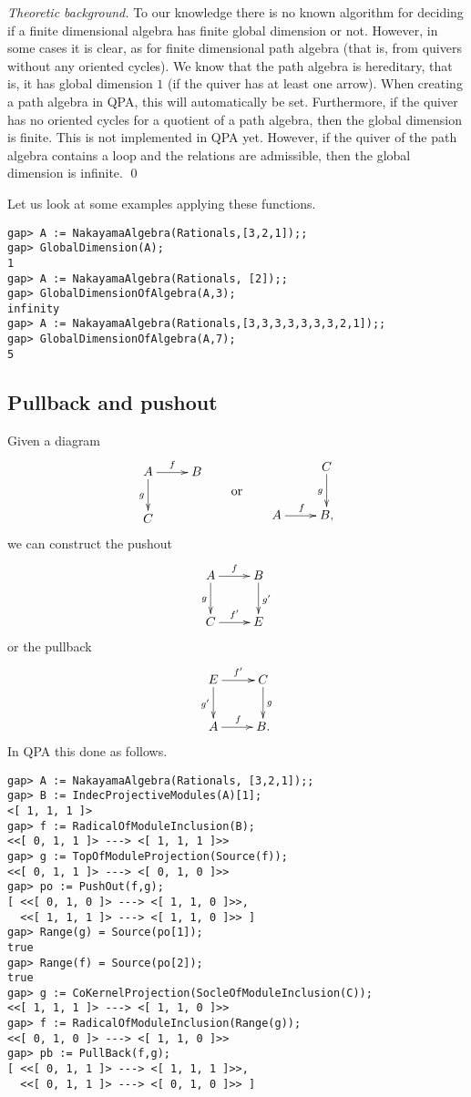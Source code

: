\documentclass{amsart}
\theoremstyle{definition}
\theoremstyle{theoretic}
\newenvironment{theoback}
{\medskip\small\textit{Theoretic background.} }
{\qed\par\medskip}
\begin{document}
\begin{theoback}
  To our knowledge there is no known algorithm for deciding if a
  finite dimensional algebra has finite global dimension or not.
  However, in some cases it is clear, as for finite dimensional path
  algebra (that is, from quivers without any oriented cycles).  We
  know that the path algebra is hereditary, that is, it has global
  dimension $1$ (if the quiver has at least one arrow).  When creating
  a path algebra in QPA, this will automatically be set.
  Furthermore, if the quiver has no oriented cycles for a quotient of
  a path algebra, then the global dimension is finite.  This is not
  implemented in QPA yet.  However, if the quiver of the path algebra
  contains a loop and the relations are admissible, then the global
  dimension is infinite.
\end{theoback}

Let us look at some examples applying these functions.
\begin{verbatim}
gap> A := NakayamaAlgebra(Rationals,[3,2,1]);;
gap> GlobalDimension(A);
1
gap> A := NakayamaAlgebra(Rationals, [2]);;
gap> GlobalDimensionOfAlgebra(A,3);
infinity
gap> A := NakayamaAlgebra(Rationals,[3,3,3,3,3,3,3,2,1]);;
gap> GlobalDimensionOfAlgebra(A,7);
5
\end{verbatim}

\subsection{Pullback and pushout}
Given a diagram
\[
\vcenter{\xymatrix{A\ar[r]^f\ar[d]_g & B\\ C & }}
\qquad\text{or}\qquad
\vcenter{\xymatrix{ & C\ar[d]_g\\  A\ar[r]^f & B,}}
\]
we can construct the pushout 
\[\xymatrix{A\ar[r]^f\ar[d]_g & B\ar[d]^{g'}\\ C\ar[r]^{f'} & E}\]
or the pullback 
\[\xymatrix{E\ar[r]^{f'}\ar[d]_{g'} & C\ar[d]^g\\ A\ar[r]^f & B.}\]
In QPA this done as follows.
\begin{verbatim}
gap> A := NakayamaAlgebra(Rationals, [3,2,1]);;                       
gap> B := IndecProjectiveModules(A)[1];
<[ 1, 1, 1 ]>
gap> f := RadicalOfModuleInclusion(B);
<<[ 0, 1, 1 ]> ---> <[ 1, 1, 1 ]>>
gap> g := TopOfModuleProjection(Source(f));
<<[ 0, 1, 1 ]> ---> <[ 0, 1, 0 ]>>
gap> po := PushOut(f,g);
[ <<[ 0, 1, 0 ]> ---> <[ 1, 1, 0 ]>>,
  <<[ 1, 1, 1 ]> ---> <[ 1, 1, 0 ]>> ]
gap> Range(g) = Source(po[1]);
true
gap> Range(f) = Source(po[2]);
true
gap> g := CoKernelProjection(SocleOfModuleInclusion(C));
<<[ 1, 1, 1 ]> ---> <[ 1, 1, 0 ]>>
gap> f := RadicalOfModuleInclusion(Range(g));
<<[ 0, 1, 0 ]> ---> <[ 1, 1, 0 ]>>
gap> pb := PullBack(f,g);
[ <<[ 0, 1, 1 ]> ---> <[ 1, 1, 1 ]>>,
  <<[ 0, 1, 1 ]> ---> <[ 0, 1, 0 ]>> ]
\end{verbatim}
\end{document}
